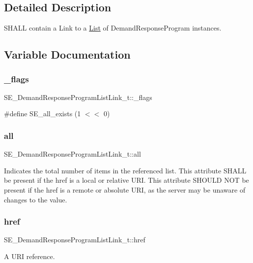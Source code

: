 \subsection{Detailed Description}
S\+H\+A\+LL contain a Link to a \hyperlink{structList}{List} of Demand\+Response\+Program instances. 

\subsection{Variable Documentation}
\mbox{\label{group__DemandResponseProgramListLink_ga5b5cab052676a036ef40ecca31c6593f}} 
\subsubsection{\texorpdfstring{\+\_\+flags}{\_flags}}
{\footnotesize\ttfamily S\+E\+\_\+\+Demand\+Response\+Program\+List\+Link\+\_\+t\+::\+\_\+flags}

\#define S\+E\+\_\+all\+\_\+exists (1 $<$$<$ 0) \mbox{\label{group__DemandResponseProgramListLink_ga6905718c355c3790f83656fc77826b20}} 
\subsubsection{\texorpdfstring{all}{all}}
{\footnotesize\ttfamily S\+E\+\_\+\+Demand\+Response\+Program\+List\+Link\+\_\+t\+::all}

Indicates the total number of items in the referenced list. This attribute S\+H\+A\+LL be present if the href is a local or relative U\+RI. This attribute S\+H\+O\+U\+LD N\+OT be present if the href is a remote or absolute U\+RI, as the server may be unaware of changes to the value. \mbox{\label{group__DemandResponseProgramListLink_gaf28f0224cca8a7b18332791bff9195aa}} 
\subsubsection{\texorpdfstring{href}{href}}
{\footnotesize\ttfamily S\+E\+\_\+\+Demand\+Response\+Program\+List\+Link\+\_\+t\+::href}

A U\+RI reference. 